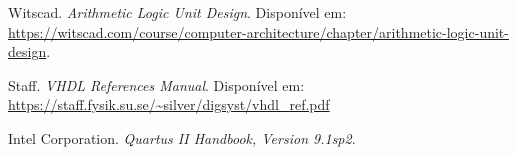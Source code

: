 \begin{thebibliography}{99}

    Witscad. \textit{Arithmetic Logic Unit Design}. Disponível em: \url{https://witscad.com/course/computer-architecture/chapter/arithmetic-logic-unit-design}.
    
    Staff. \textit{VHDL References Manual}. Disponível em: \url{https://staff.fysik.su.se/~silver/digsyst/vhdl_ref.pdf}
    
    Intel Corporation. \textit{Quartus II Handbook, Version 9.1sp2}.
\end{thebibliography}
    